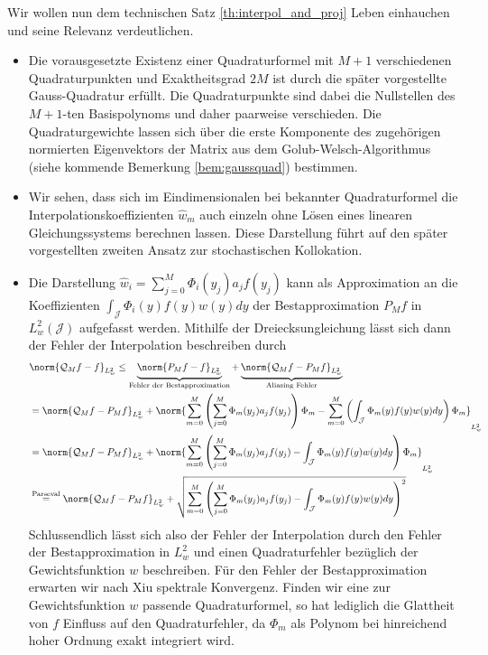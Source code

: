 \begin{mathbem}
Wir wollen nun dem technischen Satz \ref{th:interpol_and_proj} Leben einhauchen und seine Relevanz verdeutlichen.
\begin{itemize}
\item
Die vorausgesetzte Existenz einer Quadraturformel mit $M+1$ verschiedenen Quadraturpunkten und Exaktheitsgrad $2M$ ist durch die später vorgestellte Gauss-Quadratur erfüllt. Die Quadraturpunkte sind dabei die Nullstellen des $M+1$-ten Basispolynoms und daher paarweise verschieden. Die Quadraturgewichte lassen sich über die erste Komponente des zugehörigen normierten Eigenvektors der Matrix aus dem Golub-Welsch-Algorithmus (siehe kommende Bemerkung \ref{bem:gaussquad}) bestimmen.
\item
Wir sehen, dass sich im Eindimensionalen bei bekannter Quadraturformel die Interpolationskoeffizienten $\hat{w}_m$ auch einzeln ohne Lösen eines linearen Gleichungssystems berechnen lassen. Diese Darstellung führt auf den später vorgestellten zweiten Ansatz zur stochastischen Kollokation.
\item
Die Darstellung $\hat{w}_i=\sum_{j=0}^M\Phi_i(y_j)a_jf(y_j)$ kann als Approximation an die Koeffizienten $\int_\mathcal{J} \Phi_i(y)f(y)w(y)dy$ der Bestapproximation $P_Mf$ in $L_w^2(\mathcal{J})$ aufgefasst werden. Mithilfe der Dreiecksungleichung lässt sich dann der Fehler der Interpolation beschreiben durch
\begin{align*}
&\norm{\mathcal{Q}_Mf-f}_{L_w^2}\le \underbrace{\norm{P_Mf-f}_{L_w^2}}_{\text{Fehler der Bestapproximation}}+\underbrace{\norm{\mathcal{Q}_Mf-P_Mf}_{L_w^2}}_{\text{Aliasing Fehler}}\\
&=\norm{\mathcal{Q}_Mf-P_Mf}_{L_w^2}+\norm{\sum_{m=0}^M\left(\sum_{j=0}^M\Phi_m(y_j)a_jf(y_j)\right)\Phi_m-\sum_{m=0}^M\left(\int_\mathcal{J}\Phi_m(y)f(y)w(y)dy\right)\Phi_m}_{L_w^2}\\
&=\norm{\mathcal{Q}_Mf-P_Mf}_{L_w^2}+\norm{\sum_{m=0}^M\left(\sum_{j=0}^M\Phi_m(y_j)a_jf(y_j)-\int_\mathcal{J}\Phi_m(y)f(y)w(y)dy\right)\Phi_m}_{L_w^2}\\
&\stackrel{\text{Parseval}}{=}\norm{\mathcal{Q}_Mf-P_Mf}_{L_w^2}+\sqrt{\sum_{m=0}^M\left(\sum_{j=0}^M\Phi_m(y_j)a_jf(y_j)-\int_\mathcal{J}\Phi_m(y)f(y)w(y)dy\right)^2}
\end{align*}
Schlussendlich lässt sich also der Fehler der Interpolation durch den Fehler der Bestapproximation in $L_w^2$ und einen Quadraturfehler bezüglich der Gewichtsfunktion $w$ beschreiben. Für den Fehler der Bestapproximation erwarten wir nach Xiu spektrale Konvergenz. Finden wir eine zur Gewichtsfunktion $w$ passende Quadraturformel, so hat lediglich die Glattheit von $f$ Einfluss auf den Quadraturfehler, da $\Phi_m$ als Polynom bei hinreichend hoher Ordnung exakt integriert wird.
\end{itemize}
\end{mathbem}
